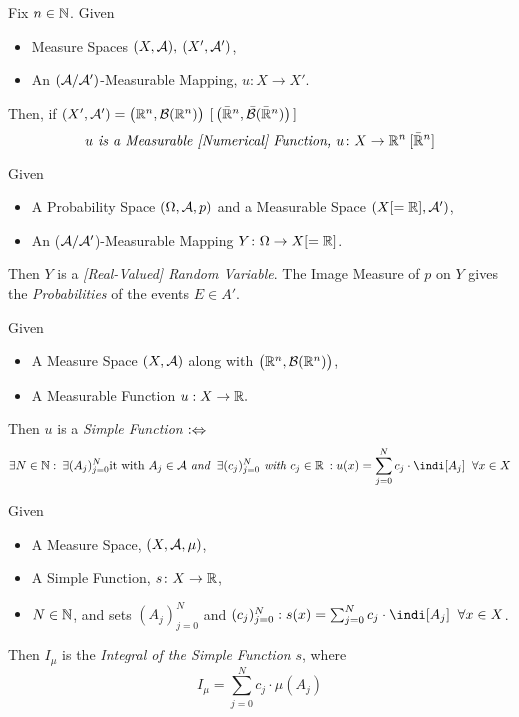 \begin{definition}
Fix $n \in \mathbb{N}$. Given
\begin{itemize}
\item
	Measure Spaces $(X, \mathcal{A}), \> (X', \mathcal{A}')$,
\item
	An $(\mathcal{A}/\mathcal{A}')$-Measurable Mapping, $u\colon X \rightarrow X'$.
\end{itemize}
Then, if $(X', \mathcal{A}') = \bigl(\mathbb{R}^n, \mathcal{B}(\mathbb{R}^n)\bigr) \>\, [\,\bigl(\bar {\mathbb{R}}^n, \bar {\mathcal{B}}(\bar {\mathbb{R}}^n)\bigr)\,]$
$$u \text{\it\ is a Measurable [Numerical] Function, } u\colon X \rightarrow \mathbb{R}^n \> [\bar {\mathbb{R}}^n]$$
\end{definition}

\begin{definition}
Given 
\begin{itemize}
\item
A Probability Space $(\Omega, \mathcal{A}, p)$ and a Measurable Space $(X[=\mathbb{R}], \mathcal{A}')$,
\item
An ($\mathcal{A}/\mathcal{A}'$)-Measurable Mapping $Y\colon\Omega \rightarrow X[= \mathbb{R}]$.
\end{itemize}
Then $Y$ is a \emph{[Real-Valued] Random Variable}.  The Image Measure of $p$ on $Y$ gives the \emph{Probabilities} of the events $E \in A'.$ 
\end{definition}

\begin{definition}
Given
\begin{itemize}
\item
	A Measure Space $(X, \mathcal{A})$ along with $\bigl(\mathbb{R}^n, \mathcal{B}(\mathbb{R}^n)\bigr)$,
\item
	A Measurable Function $u: X \rightarrow \mathbb{R}.$
\end{itemize}
Then $u$ is a \emph{Simple Function} $\mathrel{\vcentcolon\Leftrightarrow}$
$$\exists N \in \N: \> \exists(A_j)_{j=0}^N \text{it\ with } A_j \in \A \text{\it\ and } \> \exists(c_j)_{j=0}^N \text{\it\ with } %
c_j \in \R \> : u(x) = \sum_{j=0}^N c_j \cdot \indi[A_j] \;\; \forall x \in X$$
\end{definition}

\begin{definition}
Given
\begin{itemize}
\item
	A Measure Space, $(X, \mathcal{A}, \mu)$,
\item
	A Simple Function, $s\colon X \rightarrow \mathbb{R}$,
\item
	$N \in \mathbb{N}$, and sets $(A_j)_{j=0}^N$ and $(c_j)_{j=0}^N : s(x) = \sum_{j=0}^N c_j \cdot \indi[A_j] \;\; \forall x \in X$.
\end{itemize}
Then $I_\mu$ is the \emph{Integral of the Simple Function} $s$, where
$$I_\mu = \sum_{j=0}^N c_j \cdot \mu(A_j)$$
\end{definition}